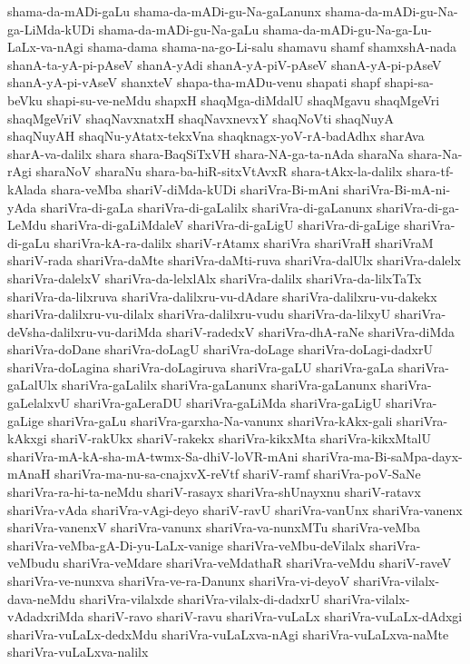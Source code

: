{shama-da-mADi-gaLu
shama-da-mADi-gu-Na-gaLanunx
shama-da-mADi-gu-Na-ga-LiMda-kUDi
shama-da-mADi-gu-Na-gaLu
shama-da-mADi-gu-Na-ga-Lu-LaLx-va-nAgi
shama-dama
shama-na-go-Li-salu
shamavu
shamf
shamxshA-nada
shanA-ta-yA-pi-pAseV
shanA-yAdi
shanA-yA-piV-pAseV
shanA-yA-pi-pAseV
shanA-yA-pi-vAseV
shanxteV
shapa-tha-mADu-venu
shapati
shapf
shapi-sa-beVku
shapi-su-ve-neMdu
shapxH
shaqMga-diMdalU
shaqMgavu
shaqMgeVri
shaqMgeVriV
shaqNavxnatxH
shaqNavxnevxY
shaqNoVti
shaqNuyA
shaqNuyAH
shaqNu-yAtatx-tekxVna
shaqknagx-yoV-rA-badAdhx
sharAva
sharA-va-dalilx
shara
shara-BaqSiTxVH
shara-NA-ga-ta-nAda
sharaNa
shara-Na-rAgi
sharaNoV
sharaNu
shara-ba-hiR-sitxVtAvxR
shara-tAkx-la-dalilx
shara-tf-kAlada
shara-veMba
shariV-diMda-kUDi
shariVra-Bi-mAni
shariVra-Bi-mA-ni-yAda
shariVra-di-gaLa
shariVra-di-gaLalilx
shariVra-di-gaLanunx
shariVra-di-ga-LeMdu
shariVra-di-gaLiMdaleV
shariVra-di-gaLigU
shariVra-di-gaLige
shariVra-di-gaLu
shariVra-kA-ra-dalilx
shariV-rAtamx
shariVra
shariVraH
shariVraM
shariV-rada
shariVra-daMte
shariVra-daMti-ruva
shariVra-dalUlx
shariVra-dalelx
shariVra-dalelxV
shariVra-da-lelxlAlx
shariVra-dalilx
shariVra-da-lilxTaTx
shariVra-da-lilxruva
shariVra-dalilxru-vu-dAdare
shariVra-dalilxru-vu-dakekx
shariVra-dalilxru-vu-dilalx
shariVra-dalilxru-vudu
shariVra-da-lilxyU
shariVra-deVsha-dalilxru-vu-dariMda
shariV-radedxV
shariVra-dhA-raNe
shariVra-diMda
shariVra-doDane
shariVra-doLagU
shariVra-doLage
shariVra-doLagi-dadxrU
shariVra-doLagina
shariVra-doLagiruva
shariVra-gaLU
shariVra-gaLa
shariVra-gaLalUlx
shariVra-gaLalilx
shariVra-gaLanunx
shariVra-gaLanunx
shariVra-gaLelalxvU
shariVra-gaLeraDU
shariVra-gaLiMda
shariVra-gaLigU
shariVra-gaLige
shariVra-gaLu
shariVra-garxha-Na-vanunx
shariVra-kAkx-gali
shariVra-kAkxgi
shariV-rakUkx
shariV-rakekx
shariVra-kikxMta
shariVra-kikxMtalU
shariVra-mA-kA-sha-mA-twmx-Sa-dhiV-loVR-mAni
shariVra-ma-Bi-saMpa-dayx-mAnaH
shariVra-ma-nu-sa-cnajxvX-reVtf
shariV-ramf
shariVra-poV-SaNe
shariVra-ra-hi-ta-neMdu
shariV-rasayx
shariVra-shUnayxnu
shariV-ratavx
shariVra-vAda
shariVra-vAgi-deyo
shariV-ravU
shariVra-vanUnx
shariVra-vanenx
shariVra-vanenxV
shariVra-vanunx
shariVra-va-nunxMTu
shariVra-veMba
shariVra-veMba-gA-Di-yu-LaLx-vanige
shariVra-veMbu-deVilalx
shariVra-veMbudu
shariVra-veMdare
shariVra-veMdathaR
shariVra-veMdu
shariV-raveV
shariVra-ve-nunxva
shariVra-ve-ra-Danunx
shariVra-vi-deyoV
shariVra-vilalx-dava-neMdu
shariVra-vilalxde
shariVra-vilalx-di-dadxrU
shariVra-vilalx-vAdadxriMda
shariV-ravo
shariV-ravu
shariVra-vuLaLx
shariVra-vuLaLx-dAdxgi
shariVra-vuLaLx-dedxMdu
shariVra-vuLaLxva-nAgi
shariVra-vuLaLxva-naMte
shariVra-vuLaLxva-nalilx
}
